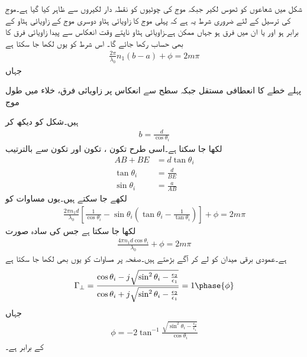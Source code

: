 شکل  میں شعاعوں کو ٹھوس لکیر جبکہ موج کی چوٹیوں کو نقطہ دار لکیروں سے ظاہر کیا گیا ہے۔موج کی ترسیل کے لئے ضروری شرط یہ ہے کہ پہلی موج کا زاویائی ہٹاو  دوسری موج کے زاویائی ہٹاو  کے برابر ہو اور یا ان میں فرق  ہو جہاں  ممکن ہے۔زاویائی ہٹاو ناپتے وقت انعکاس سے پیدا زاویائی فرق کا بھی حساب رکھا جائے گا۔ اس شرط کو یوں لکھا جا سکتا ہے
\begin{align}\label{مساوات_مویج_تختے_میں_ممکن_زاویے}
\frac{2\pi}{\lambda_0} n_1 (b-a)+\phi=2 m\pi
\end{align}
جہاں
\begin{description}
 پہلے خطے کا  انعطافی مستقل  جبکہ
 سطح سے انعکاس پر  زاویائی فرق،
 خلاء میں طول موج
\end{description}
ہیں۔شکل  کو دیکھ کر
\begin{align}
b=\frac{d}{\cos \theta_i}
\end{align}
لکھا جا سکتا ہے۔اسی طرح تکون ، تکون  اور تکون  سے بالترتیب  
\begin{align*}
AB+BE&=d\tan \theta_i\\
\tan \theta_i&=\frac{d}{BE}\\
\sin\theta_i &=\frac{a}{AB}
\end{align*}
لکھے جا سکتے ہیں۔یوں مساوات  کو
\begin{align}
\frac{2\pi n_1 d}{\lambda_0} \left[\frac{1}{\cos \theta_i}-\sin \theta_i \left(\tan \theta_i-\frac{1}{\tan \theta_i} \right) \right]+\phi=2 m \pi
\end{align}
لکھا جا سکتا ہے جس کی سادہ صورت
\begin{align}\label{مساوات_مویج_تختہ_ت}
\frac{4\pi n_1 d \cos \theta_i}{\lambda_0}+\phi=2 m \pi
\end{align}
ہے۔عمودی برقی میدان  کو لے کر آگے بڑھتے ہیں۔صفحہ  پر مساوات  کو یوں بھی لکھا جا سکتا ہے
\begin{align}\label{مساوات_مویج_تختہ_ٹ}
\Gamma_{\perp}=\frac{\cos \theta_i-j \sqrt{\sin^2 \theta_i-\frac{\epsilon_2}{\epsilon_1}}}{\cos \theta_i+j \sqrt{\sin^2 \theta_i-\frac{\epsilon_2}{\epsilon_1}}}=1\phase{\phi}
\end{align}
جہاں
\begin{align}
\phi=-2\tan^{-1} \frac{\sqrt{\sin^2 \theta_i -\frac{\epsilon_2}{\epsilon_1}} }{\cos \theta_i}
\end{align}
کے برابر ہے۔

